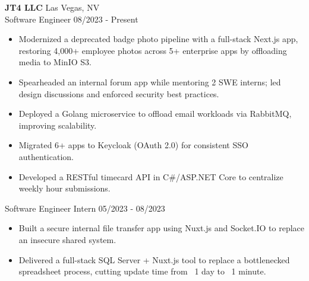 
\textbf{JT4 LLC} \hfill Las Vegas, NV \\
\textnormal{Software Engineer} \hfill 08/2023 - Present
\begin{itemize}[leftmargin=*, nosep]
  \item Modernized a deprecated badge photo pipeline with a full-stack Next.js app, restoring 4,000+ employee photos across 5+ enterprise apps by offloading media to MinIO S3.
  \item Spearheaded an internal forum app while mentoring 2 SWE interns; led design discussions and enforced security best practices.
  \item Deployed a Golang microservice to offload email workloads via RabbitMQ, improving scalability.
  \item Migrated 6+ apps to Keycloak (OAuth 2.0) for consistent SSO authentication.
  \item Developed a RESTful timecard API in C\#/ASP.NET Core to centralize weekly hour submissions.
\end{itemize}

\textnormal{Software Engineer Intern} \hfill 05/2023 - 08/2023
\begin{itemize}[leftmargin=*, nosep]
  \item Built a secure internal file transfer app using Nuxt.js and Socket.IO to replace an insecure shared system.
  \item Delivered a full-stack SQL Server + Nuxt.js tool to replace a bottlenecked spreadsheet process, cutting update time from ~1 day to ~1 minute.
\end{itemize}
